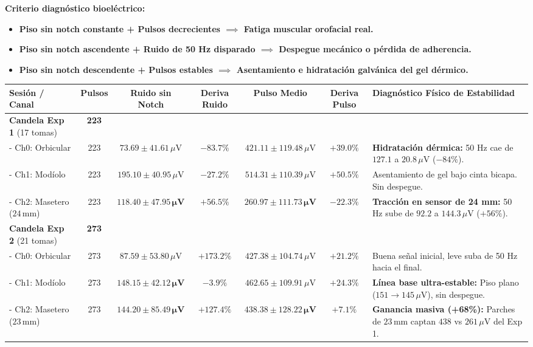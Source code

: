 \documentclass[11pt,a4paper]{article}
\begin{document}
\textbf{Criterio diagnóstico bioeléctrico:}
\begin{itemize}
    \item \textbf{Piso sin notch constante + Pulsos decrecientes $\implies$ Fatiga muscular orofacial real.}
    \item \textbf{Piso sin notch ascendente + Ruido de 50 Hz disparado $\implies$ Despegue mecánico o pérdida de adherencia.}
    \item \textbf{Piso sin notch descendente + Pulsos estables $\implies$ Asentamiento e hidratación galvánica del gel dérmico.}
\end{itemize}

\begin{table}[H]
\centering
\footnotesize
\begin{tabularx}{\textwidth}{p{3.2cm} c c c c c X}
\toprule
\textbf{Sesión / Canal} & \textbf{Pulsos} & \textbf{Ruido sin Notch} & \textbf{Deriva Ruido} & \textbf{Pulso Medio} & \textbf{Deriva Pulso} & \textbf{Diagnóstico Físico de Estabilidad} \\
\midrule
\textbf{Candela Exp 1} (17 tomas) & \textbf{223} & & & & & \\
- Ch0: Orbicular & 223 & $73.69 \pm 41.61\,\mu\text{V}$ & $-83.7\%$ & $421.11 \pm 119.48\,\mu\text{V}$ & $+39.0\%$ & \textbf{Hidratación dérmica:} 50 Hz cae de $127.1$ a $20.8\,\mu\text{V}$ ($-84\%$). \\
- Ch1: Modíolo   & 223 & $195.10 \pm 40.95\,\mu\text{V}$ & $-27.2\%$ & $514.31 \pm 110.39\,\mu\text{V}$ & $+50.5\%$ & Asentamiento de gel bajo cinta bicapa. Sin despegue. \\
- Ch2: Masetero ($24\,\text{mm}$) & 223 & $\mathbf{118.40 \pm 47.95\,\mu\text{V}}$ & $\mathbf{+56.5\%}$ & $\mathbf{260.97 \pm 111.73\,\mu\text{V}}$ & $\mathbf{-22.3\%}$ & \textbf{Tracción en sensor de 24 mm:} 50 Hz sube de $92.2$ a $144.3\,\mu\text{V}$ ($+56\%$). \\
\midrule
\textbf{Candela Exp 2} (21 tomas) & \textbf{273} & & & & & \\
- Ch0: Orbicular & 273 & $87.59 \pm 53.80\,\mu\text{V}$  & $+173.2\%$ & $427.38 \pm 104.74\,\mu\text{V}$ & $+21.2\%$ & Buena señal inicial, leve suba de 50 Hz hacia el final. \\
- Ch1: Modíolo   & 273 & $\mathbf{148.15 \pm 42.12\,\mu\text{V}}$ & $\mathbf{-3.9\%}$ & $462.65 \pm 109.91\,\mu\text{V}$ & $+24.3\%$ & \textbf{Línea base ultra-estable:} Piso plano ($151 \to 145\,\mu\text{V}$), sin despegue. \\
- Ch2: Masetero ($23\,\text{mm}$) & 273 & $\mathbf{144.20 \pm 85.49\,\mu\text{V}}$ & $\mathbf{+127.4\%}$ & $\mathbf{438.38 \pm 128.22\,\mu\text{V}}$ & $\mathbf{+7.1\%}$ & \textbf{Ganancia masiva (+68\%):} Parches de $23\,\text{mm}$ captan $438$ vs $261\,\mu\text{V}$ del Exp 1. \\

\end{tabularx}
\end{table}
\end{document}
